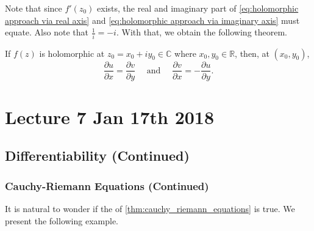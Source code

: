 \documentclass[11pt, oneside]{book}
\begin{document}
Note that since $f'(z_0)$ exists, the real and imaginary part of \cref{eq:holomorphic approach via real axis} and \cref{eq:holomorphic approach via imaginary axis} must equate. Also note that $\frac{1}{i} = -i$. With that, we obtain the following theorem.

\begin{thm}\label{thm:cauchy_riemann_equations}
	If $f(z)$ is holomorphic at $z_0 = x_0 + iy_0 \in \mathbb{C}$ where $x_0, y_0 \in \mathbb{R}$, then, at $(x_0, y_0)$,
	\begin{equation}\label{eq:cauchy_riemann_equations}
		\frac{\partial u}{\partial x} = \frac{\partial v}{\partial y} \quad \text{ and } \quad \frac{\partial v}{\partial x} = - \frac{\partial u}{\partial y}.
	\end{equation}
\end{thm}



\chapter{Lecture 7 Jan 17th 2018}
	\label{chapter:lecture_7_jan_17th_2018}

\section{Differentiability (Continued)} %
\label{sec:differentiability_continued}

\subsection{Cauchy-Riemann Equations (Continued)} %
\label{sub:cauchy_riemann_equations_continued}

It is natural to wonder if the  of \cref{thm:cauchy_riemann_equations} is true. We present the following example.
\end{document}
